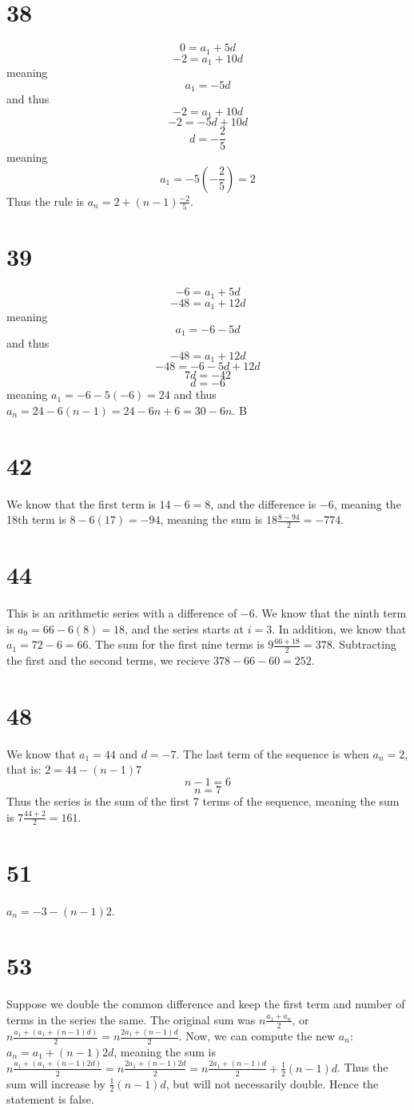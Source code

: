 \documentclass{article}
\theoremstyle{definition}
\newcommand{\?}{\stackrel{?}{=}}
\begin{document}
\section*{38}
\[ 0=a_1+5d \] \[ -2=a_1+10d \] meaning \[ a_1=-5d \] and thus \[ -2=a_1+10d \] \[ -2=-5d+10d \] \[ d=-\frac{2}{5} \] meaning \[ a_1=-5(-\frac{2}{5})=2 \]
Thus the rule is $a_n=2+(n-1)\frac{-2}{5}$.

\section*{39}
\[ -6=a_1+5d \] \[ -48=a_1+12d \] meaning \[ a_1=-6-5d \] and thus \[ -48=a_1+12d \] \[ -48=-6-5d+12d \] \[ 7d=-42 \] \[ d=-6 \] meaning $a_1=-6-5(-6)=24$ and thus 
$a_n=24-6(n-1)=24-6n+6=30-6n$. B

\section*{42}
We know that the first term is $14-6=8$, and the difference is $-6$, meaning the 18th term is $8-6(17)=-94$, meaning the sum is $18\frac{8-94}{2}=-774$.

\section*{44}
This is an arithmetic series with a difference of $-6$. We know that the ninth term is $a_9=66-6(8)=18$, and the series starts at $i=3$. In addition, we know that $a_1=72-6=66$. The sum for the first nine terms is 
$9\frac{66+18}{2}=378$. Subtracting the first and the second terms, we recieve $378-66-60=252$.

\section*{48}
We know that $a_1=44$ and $d=-7$. The last term of the sequence is when $a_n=2$, that is: $2=44-(n-1)7$ \[ n-1=6 \] \[ n=7 \] Thus the series is the sum of the first 7 terms of the sequence, meaning the sum is 
$7\frac{44+2}{2}=161$.

\section*{51}
$a_n=-3-(n-1)2$.

\section*{53}
Suppose we double the common difference and keep the first term and number of terms in the series the same. The original sum was $n\frac{a_1+a_n}{2}$, or
$n\frac{a_1+(a_1+(n-1)d)}{2}=n\frac{2a_1+(n-1)d}{2}$. Now, we can compute the new $a_n$:
$a_n=a_1+(n-1)2d$, meaning the sum is $n\frac{a_1+(a_1+(n-1)2d)}{2}=n\frac{2a_1+(n-1)2d}{2}=n\frac{2a_1+(n-1)d}{2}+\frac{1}{2}(n-1)d$. 
Thus the sum will increase by $\frac{1}{2}(n-1)d$, but will not necessarily double. Hence the statement is 
false.
\end{document}
